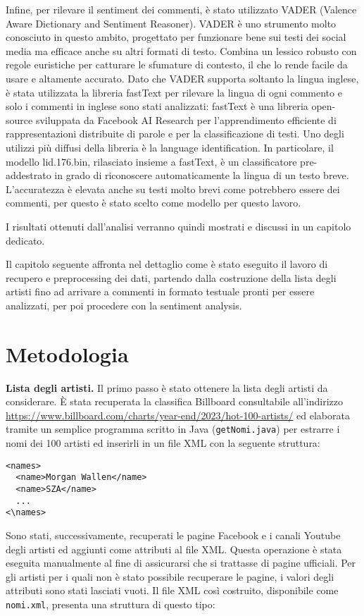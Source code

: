 \documentclass[conference]{IEEEtran}
\newcommand{\mypar}[1]{{\bf #1.}}
\begin{document}
Infine, per rilevare il sentiment dei commenti, è stato utilizzato VADER (Valence Aware Dictionary
and Sentiment Reasoner). VADER è uno strumento molto conosciuto in questo ambito, progettato per funzionare
bene sui testi dei social media ma efficace anche su altri formati di testo. Combina un
lessico robusto con regole euristiche per catturare le sfumature di contesto, il che lo rende
facile da usare e altamente accurato. Dato che VADER supporta soltanto la lingua inglese, è stata
utilizzata la libreria fastText per rilevare la lingua di ogni commento e solo i commenti in inglese
sono stati analizzati: fastText è una libreria open-source sviluppata da Facebook AI Research per
l'apprendimento efficiente di rappresentazioni distribuite di parole e per la classificazione di testi.
Uno degli utilizzi più diffusi della libreria è la language identification. In particolare, il
modello lid.176.bin, rilasciato insieme a fastText, è un classificatore pre-addestrato in grado di
riconoscere automaticamente la lingua di un testo breve. L'accuratezza è elevata anche su testi molto
brevi come potrebbero essere dei commenti, per questo è stato scelto come modello per questo lavoro.

I risultati ottenuti dall'analisi verranno quindi mostrati e discussi in un capitolo dedicato.

Il capitolo seguente affronta nel dettaglio come è stato eseguito il lavoro di recupero
e preprocessing dei dati, partendo dalla costruzione della lista degli artisti fino ad arrivare
a commenti in formato testuale pronti per essere analizzati, per poi procedere con la sentiment analysis.

\section{Metodologia}\label{sec:yourmethod}

\mypar{Lista degli artisti} Il primo passo è stato ottenere la lista degli artisti da considerare. È stata recuperata la
classifica Billboard consultabile all'indirizzo \url{https://www.billboard.com/charts/year-end/2023/hot-100-artists/} ed
elaborata tramite un semplice programma scritto in Java (\texttt{getNomi.java}) per estrarre i nomi dei 100 artisti ed
inserirli in un file XML con la seguente struttura:
\begin{lstlisting}
<names>
  <name>Morgan Wallen</name>
  <name>SZA</name>
  ...
<\names>
\end{lstlisting}

Sono stati, successivamente, recuperati le pagine Facebook e i canali Youtube degli artisti ed aggiunti
come attributi al file XML. Questa operazione è stata eseguita manualmente al fine di assicurarsi che
si trattasse di pagine ufficiali. Per gli artisti per i quali non è stato possibile recuperare le pagine,
i valori degli attributi sono stati lasciati vuoti. Il file XML così costruito, disponibile come
\texttt{nomi.xml}, presenta una struttura di questo tipo:
\end{document}
